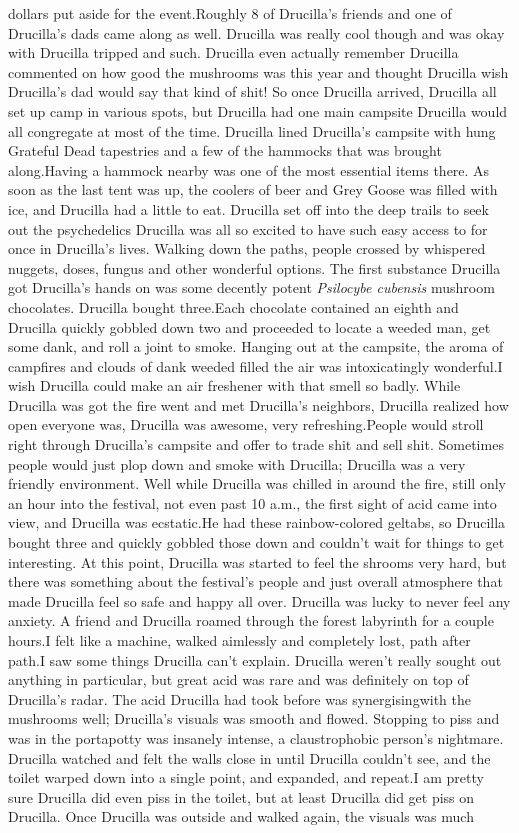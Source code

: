 \documentclass[12pt]{book}
\begin{document}
dollars put aside for the event.Roughly 8 of Drucilla's friends and one of Drucilla's dads came along as well. Drucilla was really cool though and was okay with Drucilla tripped and such. Drucilla even actually remember Drucilla commented on how good the mushrooms was this year and thought Drucilla wish Drucilla's dad would say that kind of shit! So once Drucilla arrived, Drucilla all set up camp in various spots, but Drucilla had one main campsite Drucilla would all congregate at most of the time. Drucilla lined Drucilla's campsite with hung Grateful Dead tapestries and a few of the hammocks that was brought along.Having a hammock nearby was one of the most essential items there. As soon as the last tent was up, the coolers of beer and Grey Goose was filled with ice, and Drucilla had a little to eat. Drucilla set off into the deep trails to seek out the psychedelics Drucilla was all so excited to have such easy access to for once in Drucilla's lives. Walking down the paths, people crossed by whispered nuggets, doses, fungus and other wonderful options. The first substance Drucilla got Drucilla's hands on was some decently potent \emph{Psilocybe cubensis} mushroom chocolates. Drucilla bought three.Each chocolate contained an eighth and Drucilla quickly gobbled down two and proceeded to locate a weeded man, get some dank, and roll a joint to smoke. Hanging out at the campsite, the aroma of campfires and clouds of dank weeded filled the air was intoxicatingly wonderful.I wish Drucilla could make an air freshener with that smell so badly. While Drucilla was got the fire went and met Drucilla's neighbors, Drucilla realized how open everyone was, Drucilla was awesome, very refreshing.People would stroll right through Drucilla's campsite and offer to trade shit and sell shit. Sometimes people would just plop down and smoke with Drucilla; Drucilla was a very friendly environment. Well while Drucilla was chilled in around the fire, still only an hour into the festival, not even past 10 a.m., the first sight of acid came into view, and Drucilla was ecstatic.He had these rainbow-colored geltabs, so Drucilla bought three and quickly gobbled those down and couldn't wait for things to get interesting. At this point, Drucilla was started to feel the shrooms very hard, but there was something about the festival's people and just overall atmosphere that made Drucilla feel so safe and happy all over. Drucilla was lucky to never feel any anxiety.  A friend and Drucilla roamed through the forest labyrinth for a couple hours.I felt like a machine, walked aimlessly and completely lost, path after path.I saw some things Drucilla can't explain. Drucilla weren't really sought out anything in particular, but great acid was rare and was definitely on top of Drucilla's radar. The acid Drucilla had took before was synergisingwith the mushrooms well; Drucilla's visuals was smooth and flowed. Stopping to piss and was in the portapotty was insanely intense, a claustrophobic person's nightmare. Drucilla watched and felt the walls close in until Drucilla couldn't see, and the toilet warped down into a single point, and expanded, and repeat.I am pretty sure Drucilla did even piss in the toilet, but at least Drucilla did get piss on Drucilla. Once Drucilla was outside and walked again, the visuals was much 
\end{document}
